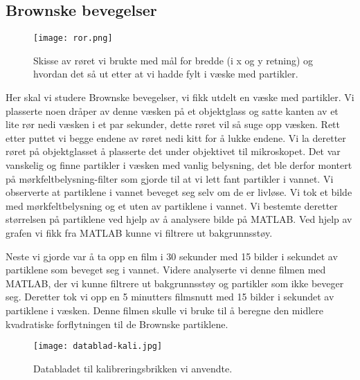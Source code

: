 \documentclass[norsk,a4paper,12pt]{article}
\begin{document}
\subsection{Brownske bevegelser}

\begin{wrapfigure}{r}{0.5\textwidth}
	\begin{center}
  	\texttt{[image: ror.png]}\\
	\caption[Skisse av røret]{Skisse av røret vi brukte med mål for bredde (i x og y retning) og hvordan det så ut etter at vi hadde fylt i væske med partikler.}
	\label{ror}
	\end{center}
\end{wrapfigure}
Her skal vi studere Brownske bevegelser, vi fikk utdelt en væske med partikler. Vi plasserte noen dråper av denne væsken på et objektglass og satte kanten av et lite rør nedi væsken i et par sekunder, dette røret vil så suge opp væsken. Rett etter puttet vi begge endene av røret nedi kitt for å lukke endene. Vi la deretter røret på objektglasset å plasserte det under objektivet til mikroskopet. Det var vanskelig og finne partikler i væsken med vanlig belysning, det ble derfor montert på mørkfeltbelysning-filter som gjorde til at vi lett fant partikler i vannet. Vi observerte at partiklene i vannet beveget seg selv om de er livløse. Vi tok et bilde med mørkfeltbelysning og et uten av partiklene i vannet. Vi bestemte deretter størrelsen på partiklene ved hjelp av å analysere bilde på MATLAB. Ved hjelp av grafen vi fikk fra MATLAB kunne vi filtrere ut bakgrunnsstøy. 

Neste vi gjorde var å ta opp en film i 30 sekunder med 15 bilder i sekundet av partiklene som beveget seg i vannet. Videre analyserte vi denne filmen med MATLAB, der vi kunne filtrere ut bakgrunnsstøy og partikler som ikke beveger seg. Deretter tok vi opp en 5 minutters filmsnutt med 15 bilder i sekundet av partiklene i væsken. Denne filmen skulle vi bruke til å beregne den midlere kvadratiske forflytningen til de Brownske partiklene. 

\begin{figure}
	\begin{center}
  	\texttt{[image: datablad-kali.jpg]}\\
	\caption[Datablad: Kalibreringsbrikke]{Databladet til kalibreringsbrikken vi anvendte.}
	\label{databladkali}
	\end{center}
\end{figure}
\end{document}
